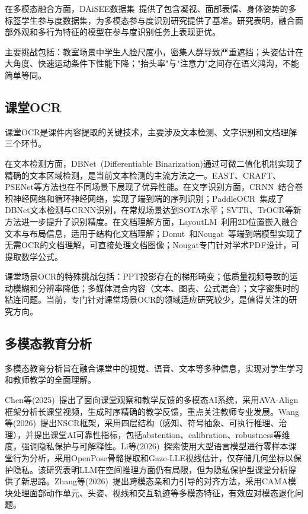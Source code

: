 \documentclass[12pt,hyperref,a4paper,UTF8]{ctexart}
\begin{document}
在多模态融合方面，DAiSEE数据集~\cite{daisee2018}提供了包含凝视、面部表情、身体姿势的多标签学生参与度数据集，为多模态参与度识别研究提供了基准。研究表明，融合面部外观和多行为特征的模型在参与度识别任务上表现更优。

主要挑战包括：教室场景中学生人脸尺度小，密集人群导致严重遮挡；头姿估计在大角度、快速运动条件下性能下降；"抬头率"与"注意力"之间存在语义鸿沟，不能简单等同。

\subsection{课堂OCR}

课堂OCR是课件内容提取的关键技术，主要涉及文本检测、文字识别和文档理解三个环节。

在文本检测方面，DBNet~\cite{liao2020real}(Differentiable Binarization)通过可微二值化机制实现了精确的文本区域检测，是当前文本检测的主流方法之一。EAST、CRAFT、PSENet等方法也在不同场景下展现了优异性能。在文字识别方面，CRNN~\cite{shi2016crnn}结合卷积神经网络和循环神经网络，实现了端到端的序列识别；PaddleOCR~\cite{du2020ppocr}集成了DBNet文本检测与CRNN识别，在常规场景达到SOTA水平；SVTR、TrOCR等新方法进一步提升了识别精度。在文档理解方面，LayoutLM~\cite{layoutlm2020}利用2D位置嵌入融合文本与布局信息，适用于结构化文档理解；Donut~\cite{donut2022}和Nougat~\cite{nougat2023}等端到端模型实现了无需OCR的文档理解，可直接处理文档图像；Nougat专门针对学术PDF设计，可提取数学公式。

课堂场景OCR的特殊挑战包括：PPT投影存在的梯形畸变；低质量视频导致的运动模糊和分辨率降低；多媒体混合内容（文本、图表、公式混合）；文字密集时的粘连问题。当前，专门针对课堂场景OCR的领域适应研究较少，是值得关注的研究方向。

\subsection{多模态教育分析}

多模态教育分析旨在融合课堂中的视觉、语音、文本等多种信息，实现对学生学习和教师教学的全面理解。

Chen等(2025)~\cite{classmind2025}提出了面向课堂观察和教学反馈的多模态AI系统，采用AVA-Align框架分析长课堂视频，生成时序精确的教学反馈，重点关注教师专业发展。Wang等(2026)~\cite{nscr2026}提出NSCR框架，采用四层结构（感知、符号抽象、可执行推理、治理），并提出课堂AI可靠性指标，包括abstention、calibration、robustness等维度，强调隐私保护与可解释性。Li等(2026)~\cite{llmattention2026}探索使用大型语言模型进行零样本课堂行为分析，采用OpenPose骨骼提取和Gaze-LLE视线估计，仅存储几何坐标以保护隐私。该研究表明LLM在空间推理方面仍有局限，但为隐私保护型课堂分析提供了新思路。Zhang等(2026)~\cite{aamla2026}提出跨模态亲和力引导的对齐方法，采用CAMA模块处理面部动作单元、头姿、视线和交互轨迹等多模态特征，有效应对模态退化问题。
\end{document}
